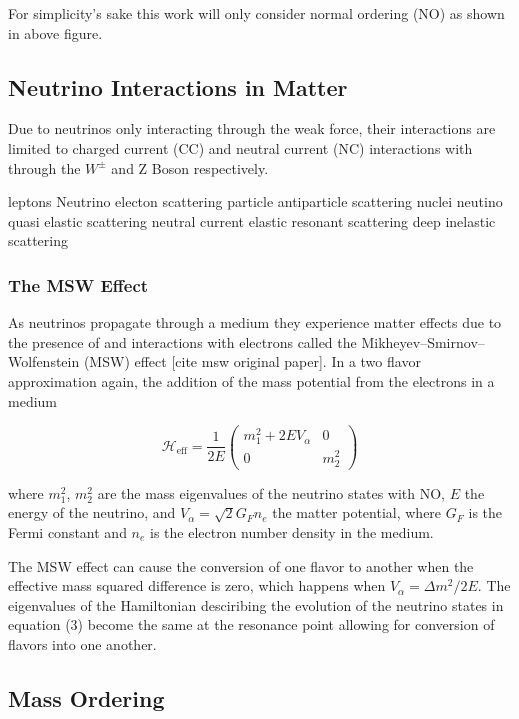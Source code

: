 \documentclass[a4paper,12pt,numbered]{article}
\begin{document}
For simplicity's sake this work will only consider normal ordering (NO) as shown in above figure. 

\subsection{Neutrino Interactions in Matter}

Due to neutrinos only interacting through the weak force, their interactions are limited to charged current (CC) and neutral current (NC) interactions with through the $W^{\pm}$ and Z Boson respectively.

leptons
Neutrino electon scattering
particle antiparticle scattering
nuclei
neutino quasi elastic scattering
neutral current elastic
resonant scattering
deep inelastic scattering

\subsubsection{The MSW Effect}

As neutrinos propagate through a medium they experience matter effects due to the presence of and interactions with electrons called the Mikheyev–Smirnov–Wolfenstein (MSW) effect [cite msw original paper]. In a two flavor approximation again, the addition of the mass potential from the electrons in a medium 

\begin{equation}
\mathcal{H}_\text{eff} = \frac{1}{2E} \begin{pmatrix} 
m_1^2 + 2 E V_\alpha & 0 \\
0 & m_2^2
\end{pmatrix}
\end{equation}

where $m_1^2$, $m_2^2$ are the mass eigenvalues of the neutrino states with NO, $E$ the energy of the neutrino, and $V_\alpha = \sqrt{2} G_F n_e$ the matter potential, where $G_F$ is the Fermi constant and $n_e$ is the electron number density in the medium.

The MSW effect can cause the conversion of one flavor to another when the effective mass squared difference is zero, which happens when $V_\alpha = \Delta m^2/2E$. The eigenvalues of the Hamiltonian desciribing the evolution of the neutrino states in equation (3) become the same at the resonance point allowing for conversion of flavors into one another.

\subsection{Mass Ordering}
\end{document}
